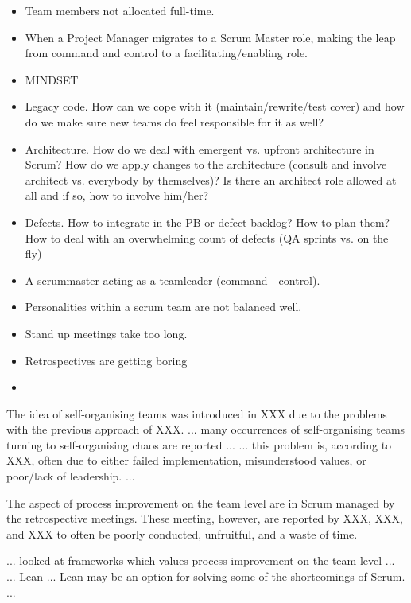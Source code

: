 \begin{itemize}
	\item Team members not allocated full-time.
	\item When a Project Manager migrates to a Scrum Master role, making the leap from command and control to a facilitating/enabling role.
	\item MINDSET
	\item Legacy code. How can we cope with it (maintain/rewrite/test cover) and how do we make sure new teams do feel responsible for it as well?
	\item Architecture. How do we deal with emergent vs. upfront architecture in Scrum? How do we apply changes to the architecture (consult and involve architect vs. everybody by themselves)? Is there an architect role allowed at all and if so, how to involve him/her?
	\item Defects. How to integrate in the PB or defect backlog? How to plan them? How to deal with an overwhelming count of defects (QA sprints vs. on the fly)
	\item  A scrummaster acting as a teamleader (command - control).
	\item Personalities within a scrum team are not balanced well.
	\item Stand up meetings take too long.
	\item Retrospectives are getting boring
	\item 
\end{itemize}
 
 
 
 
 
 
 
 
The idea of self-organising teams was introduced in XXX due to the problems with the previous approach of XXX.
... many occurrences of self-organising teams turning to self-organising chaos are reported ...
... this problem is, according to XXX, often due to either failed implementation, misunderstood values, or poor/lack of leadership. ...

The aspect of process improvement on the team level are in Scrum managed by the retrospective meetings. These meeting, however, are reported by XXX, XXX, and XXX to often be poorly conducted, unfruitful, and a waste of time. 

... looked at frameworks which values process improvement on the team level ...
... Lean ... Lean may be an option for solving some of the shortcomings of Scrum. ...




